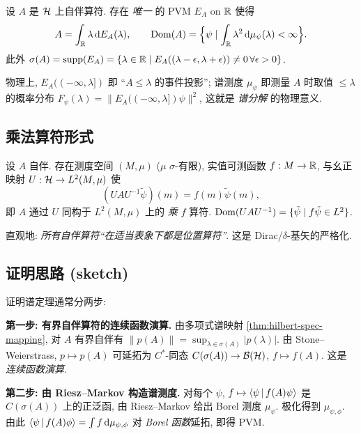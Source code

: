 \begin{theorem}\label{thm:hilbert-spec-pvm}
设 $A$ 是 $\mathcal{H}$ 上自伴算符. 存在 \emph{唯一} 的 PVM $E_A$ on $\mathbb{R}$ 使得
\begin{equation}\label{eq:hilbert-spec-thm-pvm}
A=\int_{\mathbb{R}}\lambda\,\mathrm{d} E_A(\lambda),\qquad \operatorname{Dom}(A)=\Bigl\{\psi\mid\int_{\mathbb{R}} \lambda^2\,\mathrm{d}\mu_\psi(\lambda)<\infty\Bigr\}.
\end{equation}
此外 $\sigma(A)={\rm supp}(E_A)=\{\lambda\in\mathbb{R}\mid E_A((\lambda-\epsilon,\lambda+\epsilon))\neq 0\,\forall\epsilon>0\}$.
\end{theorem}

物理上, $E_A((-\infty,\lambda])$ 即 ``$A\leq\lambda$ 的事件投影''; 谱测度 $\mu_\psi$ 即测量 $A$ 时取值 $\leq\lambda$ 的概率分布 $F_\psi(\lambda)=\|E_A((-\infty,\lambda])\psi\|^2$, 这就是 \emph{谱分解} 的物理意义.

\subsection{乘法算符形式}

\begin{theorem}\label{thm:hilbert-spec-mult}
设 $A$ 自伴. 存在测度空间 $(M,\mu)$ ($\mu$ $\sigma$-有限), 实值可测函数 $f:M\to\mathbb{R}$, 与幺正映射 $U:\mathcal{H}\to L^2(M,\mu)$ 使
\begin{equation}\label{eq:hilbert-spec-thm-mult}
(UAU^{-1}\tilde\psi)(m)=f(m)\tilde\psi(m),
\end{equation}
即 $A$ 通过 $U$ 同构于 $L^2(M,\mu)$ 上的 \emph{乘 $f$} 算符. $\operatorname{Dom}(UAU^{-1})=\{\tilde\psi\mid f\tilde\psi\in L^2\}$.
\end{theorem}

直观地: \emph{所有自伴算符``在适当表象下都是位置算符''}. 这是 Dirac/$\delta$-基矢的严格化.

\subsection{证明思路 (sketch)}

证明谱定理通常分两步:

\textbf{第一步: 有界自伴算符的连续函数演算.} 由多项式谱映射 \ref{thm:hilbert-spec-mapping}, 对 $A$ 有界自伴有 $\|p(A)\|=\sup_{\lambda\in\sigma(A)}|p(\lambda)|$. 由 Stone--Weierstrass, $p\mapsto p(A)$ 可延拓为 $C^*$-同态 $C(\sigma(A))\to\mathcal{B}(\mathcal{H})$, $f\mapsto f(A)$. 这是 \emph{连续函数演算}.

\textbf{第二步: 由 Riesz--Markov 构造谱测度.} 对每个 $\psi$, $f\mapsto \left\langle \psi \,\middle|\, f(A)\psi \right\rangle$ 是 $C(\sigma(A))$ 上的正泛函, 由 Riesz--Markov 给出 Borel 测度 $\mu_\psi$. 极化得到 $\mu_{\psi,\phi}$. 由此 $\left\langle \psi \,\middle|\, f(A)\phi \right\rangle=\int f\,\mathrm{d}\mu_{\psi,\phi}$ 对 \emph{Borel 函数}延拓, 即得 PVM.

